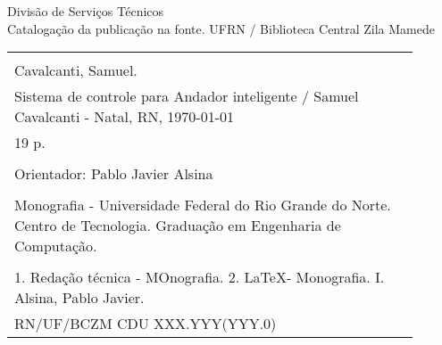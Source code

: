 %
%

\newpage

\begin{center}

\vspace*{\fill}

Divisão de Serviços Técnicos\\[1ex]
Catalogação da publicação na fonte.
UFRN / Biblioteca Central Zila Mamede

\vspace{2ex}

\begin{tabular}{|p{0.9\linewidth}|} \hline
\\ Cavalcanti, Samuel.\\
\hspace{1em} Sistema de controle para Andador inteligente /
Samuel Cavalcanti - Natal, RN, \today \\
\hspace{1em} 19 p. \\
\\
\hspace{1em} Orientador: Pablo Javier Alsina \\
\\
\hspace{1em} Monografia - Universidade Federal do Rio Grande do Norte.
Centro de Tecnologia. Graduação em Engenharia de Computação. \\
\\
\hspace{1em} 1. Redação técnica - MOnografia. 2. \LaTeX - Monografia. 
I. Alsina, Pablo Javier.
\\
RN/UF/BCZM \hfill CDU XXX.YYY(YYY.0) \\ \hline
\end{tabular} 

\end{center}

